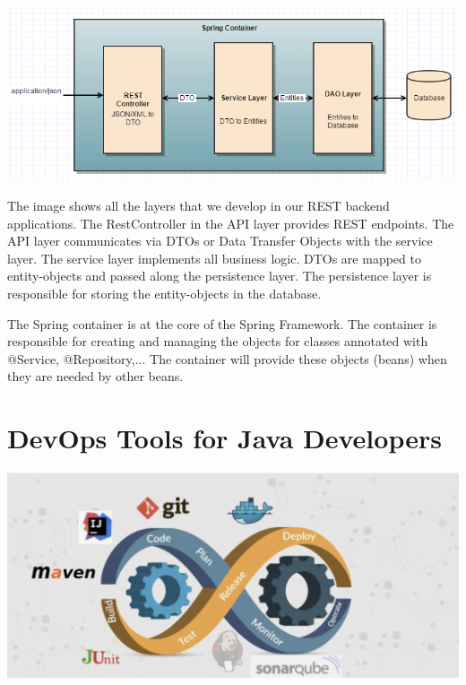 \documentclass[a4paper, 12pt]{report}
\begin{document}
\includegraphics[width=\textwidth]{./images/Spring-REST-Web-Services.png} 

The image shows all the layers that we develop in our REST backend applications. The RestController in the API layer provides REST endpoints. The API layer communicates via DTOs or Data Transfer Objects with the service layer. The service layer implements all business logic. DTOs are mapped to entity-objects and passed along the persistence layer. The persistence layer is responsible for storing the entity-objects in the database.

The Spring container is at the core of the Spring Framework. The container is responsible for creating and managing the objects for classes annotated with @Service, @Repository,... The container will provide these objects (beans) when they are needed by other beans.


\section{DevOps Tools for Java Developers}

\includegraphics[width=\textwidth]{./images/chapter1/devops.png} 

\printbibliography
\end{document}
